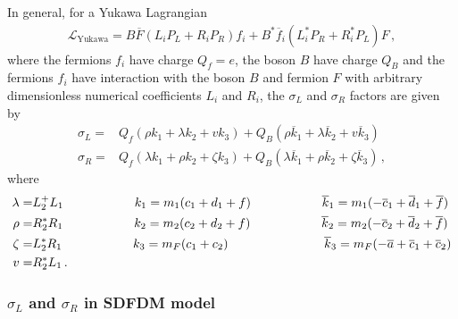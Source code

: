 In general, for a Yukawa Lagrangian
%
\begin{align}
\label{eq:general-yukawa-lagrangian}
\mathcal{L}_{\text{Yukawa}}=B\overline{F}(L_iP_L+R_iP_R)f_i+B^*\overline{f}_i(L_i^*P_R+R_i^*P_L)F\,,
\end{align}
where the fermions $f_i$ have charge $Q_f=e$, the boson $B$ have charge $Q_B$ and the fermions $f_i$ have interaction with the boson $B$ and fermion $F$ with arbitrary dimensionless numerical coefficients $L_i$ and $R_i$, the $\sigma_L$ and $\sigma_R$ factors are given by
\begin{align}
\label{eq:sigma-L}
\sigma_L=& Q_f(\rho k_1 +\lambda k_2 + v k_3)+Q_B(\rho \overline{k}_1 + \lambda \overline{k}_2 + v \overline{k}_3)\\
\label{eq:sigma-R}
\sigma_R=& Q_f(\lambda k_1 +\rho k_2 + \zeta k_3)+Q_B(\lambda \overline{k}_1 + \rho \overline{k}_2 + \zeta \overline{k}_3)\,,
\end{align} 
where
%
\begin{align}
\lambda=&L_2^+L_1 \hspace{2.0 cm} k_1=m_1(c_1+d_1+f) \hspace{2.0 cm} \overline{k}_1=m_1(-\overline{c}_1+\overline{d}_1+\overline{f}) \nonumber\\
\rho=&R_2^*R_1    \hspace{2.0 cm} k_2=m_2(c_2+d_2+f) \hspace{2.0 cm} \overline{k}_2=m_2(-\overline{c}_2+\overline{d}_2+\overline{f}) \nonumber\\
\zeta=&L_2^*R_1   \hspace{2.0 cm} k_3=m_F(c_1+c_2)   \hspace{2.7 cm} \overline{k}_3=m_F(-\overline{a}+\overline{c}_1+\overline{c}_2)  \nonumber\\
v=&R_2^*L_1 \,.
\end{align}

\subsubsection{$\sigma_L$ and $\sigma_R$ in SDFDM model}

